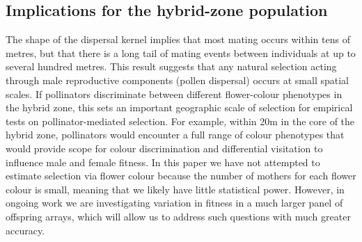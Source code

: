 \documentclass[10pt, a4paper, twocolumn]{article} %
\begin{document}

\subsection{Implications for the hybrid-zone population}

The shape of the dispersal kernel implies that most mating occurs within tens of metres, but that there is a long tail of mating events between individuals at up to several hundred metres. This result suggests that any natural selection acting through male reproductive components (pollen dispersal) occurs at small spatial scales. If pollinators discriminate between different flower-colour phenotypes in the hybrid zone, this sets an important geographic scale of selection for empirical tests on pollinator-mediated selection. For example, within 20m in the core of the hybrid zone, pollinators would encounter a full range of colour phenotypes that would provide scope for colour discrimination and differential visitation to influence male and female fitness. In this paper we have not attempted to estimate selection via flower colour because the number of mothers for each flower colour is small, meaning that we likely have little statistical power. However, in ongoing work we are investigating variation in fitness in a much larger panel of offspring arrays, which will allow us to address such questions with much greater accuracy.
\end{document}
